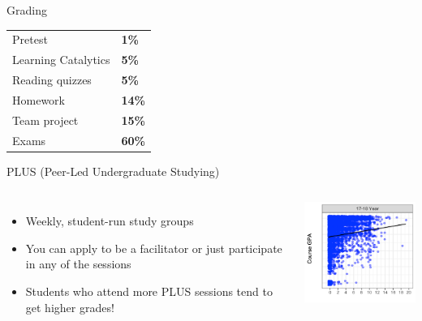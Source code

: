 \documentclass{beamer}\usepackage[]{graphicx}\usepackage[]{color}
\begin{document}
\begin{darkframes}
    \begin{frame}{Grading}
      \begin{center}
        \begin{tabular}{ll}
          Pretest             & \textbf{1\%}  \\
          Learning Catalytics & \textbf{5\%}  \\
          Reading quizzes     & \textbf{5\%}  \\
          Homework            & \textbf{14\%} \\
          Team project        & \textbf{15\%} \\
          Exams               & \textbf{60\%} \\
        \end{tabular}
      \end{center}
    \end{frame}

    \begin{frame}{PLUS (Peer-Led Undergraduate Studying)}
      \begin{columns}[onlytextwidth]
          \begin{itemize}
            \item Weekly, student-run study groups
            \item You can apply to be a facilitator or just participate in any of the sessions
            \item Students who attend more PLUS sessions tend to get higher grades!
          \end{itemize}
          \includegraphics[width=2in]{plus}
      \end{columns}
    \end{frame}


\end{darkframes}
\end{document}
